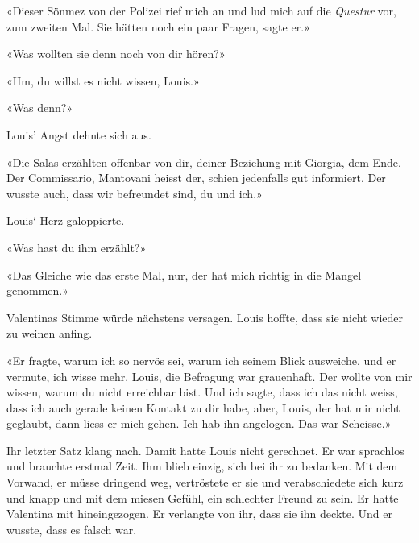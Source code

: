 «Dieser Sönmez von der Polizei rief mich an und lud mich
auf die \emph{Questur} vor, zum zweiten Mal. Sie hätten noch ein
paar Fragen, sagte er.»

«Was wollten sie denn noch von dir hören?»

«Hm, du willst es nicht wissen, Louis.»

«Was denn?»

Louis’ Angst dehnte sich aus.

«Die Salas erzählten offenbar von dir, deiner Beziehung mit Giorgia, dem
Ende. Der Commissario, Mantovani heisst der, schien jedenfalls gut
informiert. Der wusste auch, dass wir befreundet sind, du und ich.»

Louis` Herz galoppierte.

«Was hast du ihm erzählt?»

«Das Gleiche wie das erste Mal, nur, der hat mich richtig in die Mangel
genommen.»

Valentinas Stimme würde nächstens versagen. Louis hoffte, dass sie nicht
wieder zu weinen anfing.

«Er fragte, warum ich so nervös sei, warum ich seinem Blick ausweiche,
und er vermute, ich wisse mehr. Louis, die Befragung war grauenhaft. Der
wollte von mir wissen, warum du nicht erreichbar bist. Und ich sagte,
dass ich das nicht weiss, dass ich auch gerade keinen Kontakt zu dir
habe, aber, Louis, der hat mir nicht geglaubt, dann liess er mich gehen.
Ich hab ihn angelogen. Das war Scheisse.»

Ihr letzter Satz klang nach. Damit hatte Louis nicht gerechnet. Er war
sprachlos und brauchte erstmal Zeit. 
Ihm blieb einzig, sich bei ihr zu bedanken. Mit dem Vorwand, er müsse
dringend weg, vertröstete er sie und verabschiedete sich kurz und
knapp und mit dem miesen Gefühl, ein schlechter Freund zu sein. Er
hatte Valentina mit hineingezogen. Er verlangte von ihr, dass sie ihn
deckte. Und er wusste, dass es falsch war.
